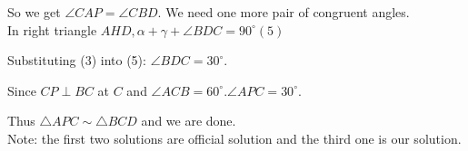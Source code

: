 \documentclass{article}
\begin{document}
So we get \(\angle C A P=\angle C B D\). We need one more pair of congruent angles.\\
In right triangle \(A H D, \alpha+\gamma+\angle B D C=90^{\circ}(5)\)

Substituting (3) into (5): \(\angle B D C=30^{\circ}\).

Since \(C P \perp B C\) at \(C\) and \(\angle A C B=60^{\circ} . \angle A P C=30^{\circ}\).

Thus \(\triangle A P C \sim \triangle B C D\) and we are done.\\
Note: the first two solutions are official solution and the third one is our solution.
\end{document}

